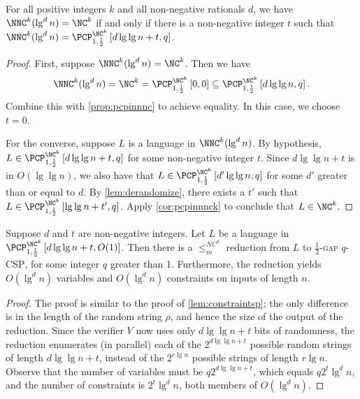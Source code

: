 \documentclass[]{article}
\newcommand{\PCPcs}[5]{\PCP^{#1}_{#2, #3}\left[#4, #5\right]}
\begin{document}
\begin{lemma}\label{lem:1}
  For all positive integers $k$ and all non-negative rationals $d$, we have $\NNC^k(\lg^d n) = \NC^k$ if and only if there is a non-negative integer $t$ such that $\NNC^k(\lg^d n) = \PCPcs{\NC^k}{1}{\frac{1}{2}}{d \lg \lg n + t}{q}$.
\end{lemma}
\begin{proof}
  First, suppose $\NNC^k(\lg^d n) = \NC^k$.
  Then we have
  \begin{equation*}
    \NNC^k(\lg^d n)
    = \NC^k
    = \PCPcs{\NC^k}{1}{\frac{1}{2}}{0}{0}
    \subseteq \PCPcs{\NC^k}{1}{\frac{1}{2}}{d \lg \lg n}{q}.
  \end{equation*}
  Combine this with \autoref{prop:pcpinnnc} to achieve equality.
  In this case, we choose $t = 0$.

  For the converse, suppose $L$ is a language in $\NNC^k(\lg^d n)$.
  By hypothesis, $L \in \PCPcs{\NC^k}{1}{\frac{1}{2}}{d \lg \lg n + t}{q}$ for some non-negative integer $t$.
  Since $d \lg \lg n + t$ is in $O(\lg \lg n)$, we also have that $L \in \PCPcs{\NC^k}{1}{\frac{1}{2}}{d' \lg \lg n}{q}$ for some $d'$ greater than or equal to $d$.
  By \autoref{lem:derandomize}, there exists a $t'$ such that $L \in \PCPcs{\NC^k}{1}{\frac{1}{2}}{\lg \lg n + t'}{q}$.
  Apply \autoref{cor:pcpinnnck} to conclude that $L \in \NC^k$.
\end{proof}

\begin{lemma}\label{lem:constraintsnc}
  Suppose $d$ and $t$ are non-negative integers.
  Let $L$ be a language in $\PCPcs{\NC^k}{1}{\frac{1}{2}}{d \lg \lg n + t}{O(1)}$.
  Then there is a $\leq_m^{NC^k}$ reduction from $L$ to \textsc{$\frac{1}{2}$-gap $q$-CSP}, for some integer $q$ greater than 1.
  Furthermore, the reduction yields $O(\lg^d n)$ variables and $O(\lg^d n)$ constraints on inputs of length $n$.
\end{lemma}
\begin{proof}
  The proof is similar to the proof of \autoref{lem:constraintsp}; the only difference is in the length of the random string $\rho$, and hence the size of the output of the reduction.
  Since the verifier $V$ now uses only $d \lg \lg n + t$ bits of randomness, the reduction enumerates (in parallel) each of the $2^{d \lg \lg n + t}$ possible random strings of length $d \lg \lg n + t$, instead of the $2^{r \lg n}$ possible strings of length $r \lg n$.
  Observe that the number of variables must be $q 2^{d \lg \lg n + t}$, which equals $q 2^t \lg^d n$, and the number of constraints is $2^t \lg^d n$, both members of $O(\lg^d n)$.
\end{proof}
\end{document}
